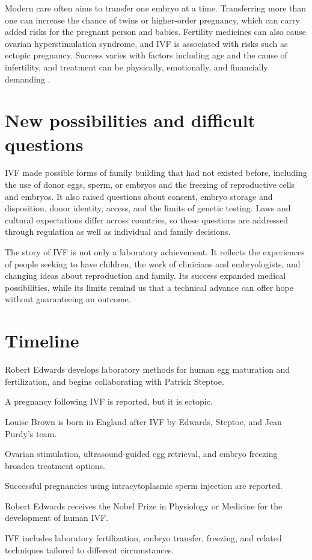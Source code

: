 \documentclass[12pt,oneside]{book}
\begin{document}
Modern care often aims to transfer one embryo at a time. Transferring more
than one can increase the chance of twins or higher-order pregnancy, which
can carry added risks for the pregnant person and babies. Fertility
medicines can also cause ovarian hyperstimulation syndrome, and IVF is
associated with risks such as ectopic pregnancy. Success varies with factors
including age and the cause of infertility, and treatment can be physically,
emotionally, and financially demanding \cite{hfeaIVF}.

\section{New possibilities and difficult questions}
IVF made possible forms of family building that had not existed before,
including the use of donor eggs, sperm, or embryos and the freezing of
reproductive cells and embryos. It also raised questions about consent,
embryo storage and disposition, donor identity, access, and the limits of
genetic testing. Laws and cultural expectations differ across countries,
so these questions are addressed through regulation as well as individual
and family decisions.

The story of IVF is not only a laboratory achievement. It reflects the
experiences of people seeking to have children, the work of clinicians and
embryologists, and changing ideas about reproduction and family. Its
success expanded medical possibilities, while its limits remind us that a
technical advance can offer hope without guaranteeing an outcome.

\section*{Timeline}
\begin{description}[leftmargin=2.3cm,style=nextline]
  \item[1960s] Robert Edwards develops laboratory methods for human egg maturation and fertilization, and begins collaborating with Patrick Steptoe.
  \item[1976] A pregnancy following IVF is reported, but it is ectopic.
  \item[1978] Louise Brown is born in England after IVF by Edwards, Steptoe, and Jean Purdy's team.
  \item[1980s] Ovarian stimulation, ultrasound-guided egg retrieval, and embryo freezing broaden treatment options.
  \item[1992] Successful pregnancies using intracytoplasmic sperm injection are reported.
  \item[2010] Robert Edwards receives the Nobel Prize in Physiology or Medicine for the development of human IVF.
  \item[Today] IVF includes laboratory fertilization, embryo transfer, freezing, and related techniques tailored to different circumstances.
\end{description}
\end{document}
